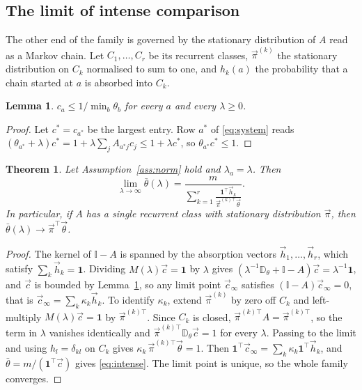 \documentclass[12pt]{article}
\newtheorem{theorem}{Theorem}
\newtheorem{lemma}{Lemma}
\theoremstyle{definition}
\theoremstyle{remark}
\newcommand{\bth}{\bar\theta}
\newcommand{\D}{\mathbb{D}}
\begin{document}
\subsection{The limit of intense comparison}
\label{sec:intense}

The other end of the family is governed by the stationary distribution of $A$
read as a Markov chain. Let $C_1,\dots,C_r$ be its recurrent classes,
$\vec\pi^{(k)}$ the stationary distribution on $C_k$ normalised to sum to one,
and $h_k(a)$ the probability that a chain started at $a$ is absorbed into
$C_k$.

\begin{lemma}
\label{lem:bound}
$c_a\leq1/\min_b\theta_b$ for every $a$ and every $\lambda\geq0$.
\end{lemma}

\begin{proof}
Let $c^{*}=c_{a^{*}}$ be the largest entry. Row $a^{*}$ of \eqref{eq:system}
reads $(\theta_{a^{*}}+\lambda)c^{*}=1+\lambda\sum_jA_{a^{*}j}c_j\leq1+\lambda c^{*}$,
so $\theta_{a^{*}}c^{*}\leq1$.
\end{proof}

\begin{theorem}
\label{thm:intense}
Let Assumption~\ref{ass:norm} hold and $\lambda_a=\lambda$. Then
%
\begin{equation}
\lim_{\lambda\to\infty}\bth(\lambda)
=\frac{m}{\displaystyle\sum_{k=1}^{r}
\frac{\mathbf 1^{\top}\vec h_k}{\vec\pi^{(k)\top}\vec\theta}} .
\label{eq:intense}
\end{equation}
%
In particular, if $A$ has a single recurrent class with stationary distribution
$\vec\pi$, then $\bth(\lambda)\to\vec\pi^{\top}\vec\theta$.
\end{theorem}

\begin{proof}
The kernel of $\mathbb{I}-A$ is spanned by the absorption vectors
$\vec h_1,\dots,\vec h_r$, which satisfy $\sum_k\vec h_k=\mathbf 1$. Dividing
$M(\lambda)\vec c=\mathbf 1$ by $\lambda$ gives
$(\lambda^{-1}\D_{\theta}+\mathbb{I}-A)\vec c=\lambda^{-1}\mathbf 1$, and
$\vec c$ is bounded by Lemma~\ref{lem:bound}, so any limit point $\vec c_\infty$
satisfies $(\mathbb{I}-A)\vec c_\infty=0$, that is
$\vec c_\infty=\sum_k\kappa_k\vec h_k$. To identify $\kappa_k$, extend
$\vec\pi^{(k)}$ by zero off $C_k$ and left-multiply $M(\lambda)\vec c=\mathbf 1$
by $\vec\pi^{(k)\top}$. Since $C_k$ is closed, $\vec\pi^{(k)\top}A=\vec\pi^{(k)\top}$,
so the term in $\lambda$ vanishes identically and
$\vec\pi^{(k)\top}\D_{\theta}\vec c=1$ for every $\lambda$. Passing to the limit
and using $h_l=\delta_{kl}$ on $C_k$ gives
$\kappa_k\,\vec\pi^{(k)\top}\vec\theta=1$. Then
$\mathbf 1^{\top}\vec c_\infty=\sum_k\kappa_k\mathbf 1^{\top}\vec h_k$, and
$\bth=m/(\mathbf 1^{\top}\vec c)$ gives \eqref{eq:intense}. The limit point is
unique, so the whole family converges.
\end{proof}
\end{document}
